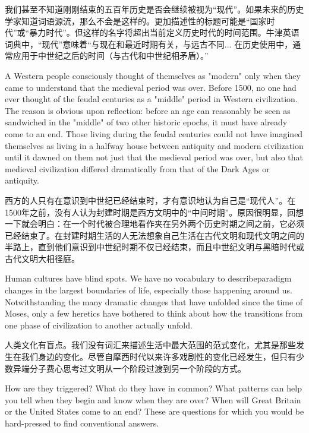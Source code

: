 \begin{Parallel}{97mm}{45mm}
  \ParallelRText
  {我们甚至不知道刚刚结束的五百年历史是否会继续被视为“现代”。如果未来的历史学家知道词语源流，那么不会是这样的。更加描述性的标题可能是“国家时代”或“暴力时代”。但这样的名字将超出当前定义历史时代的时间范围。牛津英语词典中，“现代”意味着“与现在和最近时期有关，与远古不同... 在历史使用中，通常应用于中世纪之后的时间（与古代和中世纪相矛盾）。”}

  \ParallelPar 


  \ParallelLText
  {A Western people consciously thought of themselves as "modern" only when they came to understand that the medieval period was over. Before 1500, no one had ever thought of the feudal centuries as a "middle" period in Western civilization. The reason is obvious upon reflection: before an age can reasonably be seen as sandwiched in the "middle" of two other historic epochs, it must have already come to an end. Those living during the feudal centuries could not have imagined themselves as living in a halfway house between antiquity and modern civilization until it dawned on them not just that the medieval period was over, but also that medieval civilization differed dramatically from that of the Dark Ages or antiquity.}
  
  \ParallelRText
  {西方的人只有在意识到中世纪已经结束时，才有意识地认为自己是“现代人”。在1500年之前，没有人认为封建时期是西方文明中的“中间时期”。原因很明显，回想一下就会明白：在一个时代被合理地看作夹在另外两个历史时期之间之前，它必须已经结束了。在封建时期生活的人无法想象自己生活在古代文明和现代文明之间的半路上，直到他们意识到中世纪时期不仅已经结束，而且中世纪文明与黑暗时代或古代文明大相径庭。}

  \ParallelPar

  \ParallelLText
  {Human cultures have blind spots. We have no vocabulary to describeparadigm changes in the largest boundaries of life, especially those happening around us. Notwithstanding the many dramatic changes that have unfolded since the time of Moses, only a few heretics have bothered to think about how the transitions from one phase of civilization to another actually unfold.}


  \ParallelRText
  {人类文化有盲点。我们没有词汇来描述生活中最大范围的范式变化，尤其是那些发生在我们身边的变化。尽管自摩西时代以来许多戏剧性的变化已经发生，但只有少数异端分子费心思考过文明从一个阶段过渡到另一个阶段的方式。}

  \ParallelPar  

  \ParallelLText
  {How are they triggered? What do they have in common? What patterns can help you tell when they begin and know when they are over? When will Great Britain or the United States come to an end? These are questions for which you would be hard-pressed to find conventional answers.}
 

\end{Parallel}
